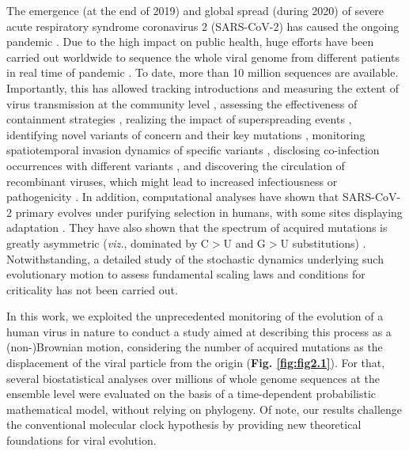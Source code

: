 The emergence (at the end of 2019) and global spread (during 2020) of severe acute respiratory syndrome coronavirus 2 (SARS-CoV-2) has caused the ongoing pandemic \cite{li2021}. Due to the high impact on public health, huge efforts have been carried out worldwide to sequence the whole viral genome from different patients in real time of pandemic \cite{bedford2020, lopez2021, lemieux2021, tegally2021, kraemer2021, rockett2022, jackson2021}. To date, more than 10 million sequences are available. Importantly, this has allowed tracking introductions and measuring the extent of virus transmission at the community level \cite{bedford2020}, assessing the effectiveness of containment strategies \cite{lopez2021}, realizing the impact of superspreading events \cite{lemieux2021}, identifying novel variants of concern and their key mutations \cite{tegally2021}, monitoring spatiotemporal invasion dynamics of specific variants \cite{kraemer2021}, disclosing co-infection occurrences with different variants \cite{rockett2022}, and discovering the circulation of recombinant viruses, which might lead to increased infectiousness or pathogenicity \cite{jackson2021}. In addition, computational analyses have shown that SARS-CoV-2 primary evolves under purifying selection in humans, with some sites displaying adaptation \cite{rochman2021}. They have also shown that the spectrum of acquired mutations is greatly asymmetric (\textit{viz.}, dominated by C$>$U and G$>$U substitutions) \cite{yi2021}. Notwithstanding, a detailed study of the stochastic dynamics underlying such evolutionary motion to assess fundamental scaling laws and conditions for criticality has not been carried out.

In this work, we exploited the unprecedented monitoring of the evolution of a human virus in nature to conduct a study aimed at describing this process as a (non-)Brownian motion, considering the number of acquired mutations as the displacement of the viral particle from the origin (\textbf{Fig. \ref{fig:fig2.1}}). For that, several biostatistical analyses over millions of whole genome sequences at the ensemble level were evaluated on the basis of a time-dependent probabilistic mathematical model, without relying on phylogeny. Of note, our results challenge the conventional molecular clock hypothesis by providing new theoretical foundations for viral evolution. 


